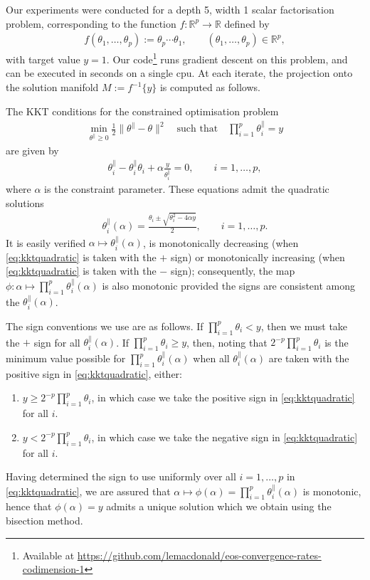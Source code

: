 \documentclass{article}
\newcommand{\RB}{\mathbb{R}}
\newcommand{\tpa}{\theta^{\parallel}}
\theoremstyle{plain}
\theoremstyle{definition}
\theoremstyle{remark}
\begin{document}
Our experiments were conducted for a depth 5, width 1 scalar factorisation problem, corresponding to the function $f:\RB^p\rightarrow\RB$ defined by
\begin{align}
    f(\theta_1,\dots,\theta_p):=\theta_p\cdots\theta_1,\qquad (\theta_1,\dots,\theta_p)\in\RB^p,
\end{align}
with target value $y=1$. Our code\footnote{Available at \url{https://github.com/lemacdonald/eos-convergence-rates-codimension-1}} runs gradient descent on this problem, and can be executed in seconds on a single cpu. At each iterate, the projection onto the solution manifold $M:=f^{-1}\{y\}$ is computed as follows.

The KKT conditions for the constrained optimisation problem
\begin{align}
    \min_{\tpa\geq 0}\frac{1}{2}\|\tpa-\theta\|^2\quad\text{such that}\quad \prod_{i=1}^p\tpa_i = y
\end{align}
are given by
\begin{align}
    \tpa_i-\tpa_i\theta_i+\alpha\frac{y}{\tpa_i} = 0,\qquad i=1,\dots,p,
\end{align}
where $\alpha$ is the constraint parameter. These equations admit the quadratic solutions
\begin{align}
    \tpa_i(\alpha) = \frac{\theta_i\pm\sqrt{\theta_i^2-4\alpha y}}{2},\qquad i=1,\dots,p.\label{eq:kktquadratic}
\end{align}
It is easily verified $\alpha\mapsto\tpa_i(\alpha)$, is monotonically decreasing (when \eqref{eq:kktquadratic} is taken with the $+$ sign) or monotonically increasing (when \eqref{eq:kktquadratic} is taken with the $-$ sign); consequently, the map $\phi:\alpha\mapsto \prod_{i=1}^p\tpa_i(\alpha)$ is also monotonic provided the signs are consistent among the $\tpa_i(\alpha)$.

The sign conventions we use are as follows. If $\prod_{i=1}^p\theta_i <y$, then we must take the $+$ sign for all $\tpa_i(\alpha)$. If $\prod_{i=1}^p\theta_i\geq y$, then, noting that $2^{-p}\prod_{i=1}^p\theta_i$ is the minimum value possible for $\prod_{i=1}^p\tpa_i(\alpha)$ when all $\tpa_i(\alpha)$ are taken with the positive sign in \eqref{eq:kktquadratic}, either:
\begin{enumerate}
    \item $y\geq 2^{-p}\prod_{i=1}^p\theta_i$, in which case we take the positive sign in \eqref{eq:kktquadratic} for all $i$.
    \item $y< 2^{-p}\prod_{i=1}^p\theta_i$, in which case we take the negative sign in \eqref{eq:kktquadratic} for all $i$.
\end{enumerate}
Having determined the sign to use uniformly over all $i=1,\dots,p$ in \eqref{eq:kktquadratic}, we are assured that $\alpha\mapsto\phi(\alpha) = \prod_{i=1}^p\tpa_i(\alpha)$ is monotonic, hence that $\phi(\alpha) = y$ admits a unique solution which we obtain using the bisection method.
\end{document}
